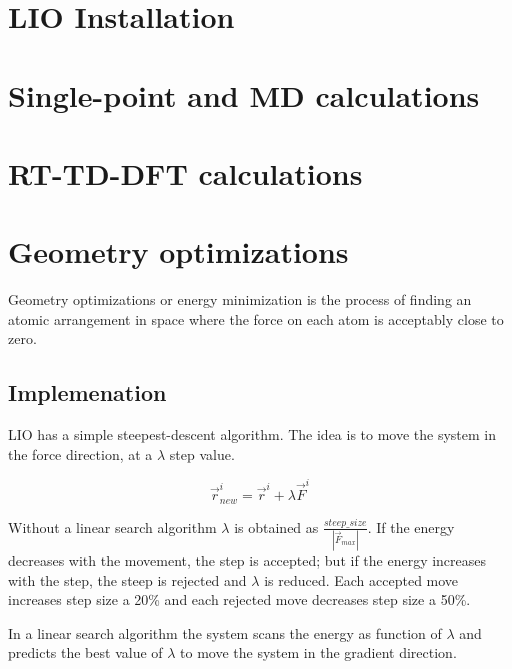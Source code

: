 \documentclass[journal=jctcce,manuscript=article]{achemso}
\begin{document}
\newpage
\section{LIO Installation}

\newpage
\section{Single-point and MD calculations}

\newpage
\section{RT-TD-DFT calculations}

\newpage
\section{Geometry optimizations}

Geometry optimizations or energy minimization is the process of finding an atomic arrangement in space where the force on each atom is acceptably close to zero.

    \subsection{Implemenation}
    
    LIO has a simple steepest-descent algorithm. The idea is to move the system in the force direction, at a $\lambda$ step value.
    
    \begin{equation}
      \vec{r}^i_{new}=\vec{r}^i + \lambda  \vec{F}^i  
      \label{new_force}
    \end{equation}
    
    Without a linear search algorithm $\lambda$ is obtained as $\frac{steep\_ size}{|\vec{F}_{max}|}$. If the energy decreases with the movement, the step is accepted; but if the energy increases with the step, the steep is rejected and $\lambda$ is reduced. Each accepted move increases step size a 20\% and each rejected move decreases step size a 50\%.
    
    In a linear search algorithm the system scans the energy as function of $\lambda$ and predicts the best value of $\lambda$ to move the system in the gradient direction.
    
\end{document}
